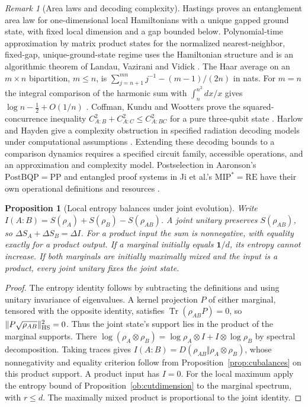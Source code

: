 \documentclass[aps,pra,onecolumn,superscriptaddress,nofootinbib,10pt]{revtex4-2}
\newtheorem{proposition}[theorem]{Proposition}
\theoremstyle{definition}
\theoremstyle{remark}
\newtheorem{remark}[theorem]{Remark}
\begin{document}
\begin{remark}[Area laws and decoding complexity]\label{ob:horizonliterature}
Hastings proves an entanglement area law for one-dimensional local
Hamiltonians with a unique gapped ground state, with fixed local
dimension and a gap bounded below. Polynomial-time approximation
by matrix product states for the normalized nearest-neighbor,
fixed-gap, unique-ground-state regime uses the Hamiltonian structure
and is an algorithmic theorem of Landau, Vazirani and Vidick
\cite{obr:hastingsarea,obr:lvv}. The Haar average on an \(m\times n\)
bipartition, \(m\le n\), is
\(\sum_{j=n+1}^{mn}j^{-1}-(m-1)/(2n)\) in nats. For \(m=n\) the
integral comparison of the harmonic sum with \(\int_n^{n^2}dx/x\)
gives \(\log n-\tfrac12+O(1/n)\)
\cite{n1-page,obr:sen}.
Coffman, Kundu and Wootters prove the squared-concurrence inequality
\(C_{A:B}^2+C_{A:C}^2\le C_{A:BC}^2\) for a pure three-qubit state
\cite{n4:CKW}. Harlow and Hayden give a complexity obstruction in
specified radiation decoding models under computational assumptions
\cite{obr:hh}. Extending these decoding bounds to a comparison
dynamics requires a specified circuit family, accessible operations,
and an approximation and complexity model. Postselection in
Aaronson's \(\mathrm{PostBQP}=\mathrm{PP}\) and entangled proof systems
in Ji et al.'s \(\mathrm{MIP}^*=\mathrm{RE}\) have their own operational
definitions and resources \cite{obr:aaronson,obr:mip}.
\end{remark}

\begin{proposition}[Local entropy balances under joint evolution]\label{ob:arrow}
Write \(I(A:B)=S(\rho_A)+S(\rho_B)-S(\rho_{AB})\).
A joint unitary preserves \(S(\rho_{AB})\), so
\(\Delta S_A+\Delta S_B=\Delta I\). For a product input the sum is
nonnegative, with equality exactly for a product output. If a
marginal initially equals \(\mathbf1/d\), its entropy cannot increase.
If both marginals are initially maximally mixed and the input is a
product, every joint unitary fixes the joint state.
\end{proposition}
\begin{proof}
The entropy identity follows by subtracting the definitions and using
unitary invariance of eigenvalues. A kernel projection \(P\) of
either marginal, tensored with the opposite identity, satisfies
\(\operatorname{Tr}(\rho_{AB} P)=0\), so
\(\|P\sqrt{\rho_{AB}}\|_{\rm HS}^2=0\). Thus the joint state's
support lies in the product of the marginal supports. There
\(\log(\rho_A\otimes\rho_B)=\log\rho_A\otimes I+I\otimes\log\rho_B\)
by spectral decomposition. Taking traces gives
\(I(A:B)=D(\rho_{AB}\Vert\rho_A\otimes\rho_B)\), whose nonnegativity
and equality criterion follow from Proposition~\ref{prop:cubalances}
on this product support. A product input has \(I=0\).
For the local maximum apply the entropy bound of
Proposition~\ref{ob:cutdimension} to the marginal spectrum, with \(r\le d\).
The maximally mixed product is proportional to the joint identity.
\end{proof}
\end{document}
